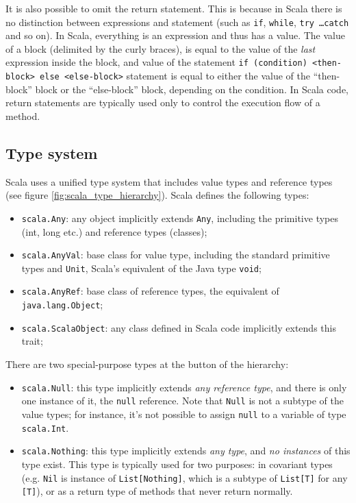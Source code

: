 It is also possible to omit the return statement. This is because in Scala there is no distinction between expressions and statement (such as \texttt{if}, \texttt{while}, \texttt{try \dots catch} and so on). In Scala, everything is an expression and thus has a value. The value of a block (delimited by the curly braces), is equal to the value of the \emph{last} expression inside the block, and value of the statement \texttt{if (condition) <then-block> else <else-block>} statement is equal to either the value of the ``then-block'' block or the ``else-block'' block, depending on the condition. In Scala code, return statements are typically used only to control the execution flow of a method.

\subsection{Type system}

Scala uses a unified type system that includes value types and reference types (see figure \ref{fig:scala_type_hierarchy}). Scala defines the following types:
\begin{itemize}
\item \texttt{scala.Any}: any object implicitly extends \texttt{Any}, including the primitive types (int, long etc.) and reference types (classes);
\item \texttt{scala.AnyVal}: base class for value type, including the standard primitive types and \texttt{Unit}, Scala's equivalent of the Java type \texttt{void};
\item \texttt{scala.AnyRef}: base class of reference types, the equivalent of \texttt{java.lang.Object};
\item \texttt{scala.ScalaObject}: any class defined in Scala code implicitly extends this trait;
\end{itemize}

\noindent There are two special-purpose types at the button of the hierarchy:
\begin{itemize}
\item \texttt{scala.Null}: this type implicitly extends \emph{any reference type}, and there is only one instance of it, the \texttt{null} reference. Note that \texttt{Null} is not a subtype of the value types; for instance, it's not possible to assign \texttt{null} to a variable of type \texttt{scala.Int}.

\item \texttt{scala.Nothing}: this type implicitly extends \emph{any type}, and \emph{no instances} of this type exist. This type is typically used for two purposes: in covariant types (e.g. \texttt{Nil} is instance of \texttt{List[Nothing]}, which is a subtype of \texttt{List[T]} for any \texttt{[T]}), or as a return type of methods that never return normally.
\end{itemize}

